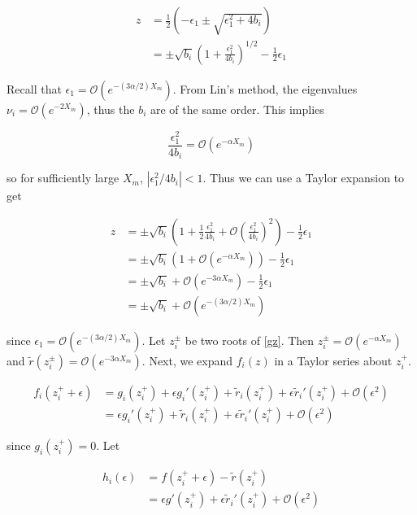 \documentclass[12pt]{article}
\begin{document}
\begin{align*}
z &= \frac{1}{2}\left(-\epsilon_1 \pm \sqrt{\epsilon_1^2 + 4 b_i}\right) \\
&=  \pm \sqrt{b_i} \left( 1 + \frac{\epsilon_1^2}{4 b_i} \right)^{1/2} - \frac{1}{2} \epsilon_1
\end{align*}

Recall that $\epsilon_1  = \mathcal{O}(e^{-(3 \alpha/2) X_m})$. From Lin's method, the eigenvalues $\nu_i = \mathcal{O}(e^{-2 X_m})$, thus the $b_i$ are of the same order. This implies

\begin{equation}
\frac{\epsilon_1^2}{4 b_i} = \mathcal{O}(e^{-\alpha X_m})
\end{equation}

so for sufficiently large $X_m$, $|\epsilon_1^2/4 b_i| < 1$. Thus we can use a Taylor expansion to get

\begin{align*}
z &= \pm \sqrt{b_i} \left( 1 + \frac{1}{2} \frac{\epsilon_1^2}{4 b_i} + \mathcal{O}\left( \frac{\epsilon_1^2}{4 b_i}\right)^2 \right) - \frac{1}{2} \epsilon_1 \\
&= \pm \sqrt{b_i} \left( 1 + \mathcal{O}(e^{-\alpha X_m}) \right) - \frac{1}{2} \epsilon_1 \\
&= \pm \sqrt{b_i} + \mathcal{O}(e^{-3 \alpha X_m}) - \frac{1}{2} \epsilon_1 \\
&= \pm \sqrt{b_i} + \mathcal{O}(e^{-(3 \alpha/2) X_m})
\end{align*}

since $\epsilon_1  = \mathcal{O}(e^{-(3 \alpha/2) X_m})$. Let $z_i^\pm$ be two roots of \eqref{gz}. Then $z_i^\pm = \mathcal{O}(e^{-\alpha X_m})$ and $\tilde{r}(z_i^\pm) = \mathcal{O}(e^{-3 \alpha X_m})$. Next, we expand $f_i(z)$ in a Taylor series about $z_i^+$.

\begin{align*}
f_i(z_i^+ + \epsilon) &= g_i(z_i^+) + \epsilon g_i'(z_i^+) 
+ \tilde{r}_i(z_i^+) + \epsilon \tilde{r}_i'(z_i^+) + \mathcal{O}(\epsilon^2) \\
&= \epsilon g_i'(z_i^+) 
+ \tilde{r}_i(z_i^+) + \epsilon \tilde{r}_i'(z_i^+) + \mathcal{O}(\epsilon^2)
\end{align*} 

since $g_i(z_i^+) = 0$. Let 

\begin{align*}
h_i(\epsilon) &= f(z_i^+ + \epsilon) - \tilde{r}(z_i^+) \\
&= \epsilon g'(z_i^+) + \epsilon \tilde{r}_i'(z_i^+) + \mathcal{O}(\epsilon^2)
\end{align*}
\end{document}
